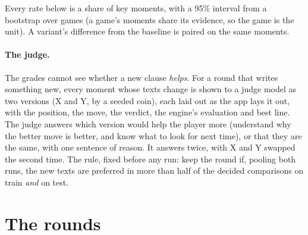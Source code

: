 \documentclass[11pt]{article}
\begin{document}
Every rate below is a share of key moments, with a 95\% interval from a bootstrap over games
(a game's moments share its evidence, so the game is the unit). A variant's difference from the
baseline is paired on the same moments.

\paragraph{The judge.} The grades cannot see whether a new clause \emph{helps}. For a round that
writes something new, every moment whose texts change is shown to a judge model as two versions
(X and Y, by a seeded coin), each laid out as the app lays it out, with the position, the move,
the verdict, the engine's evaluation and best line. The judge answers which version would help
the player more (understand why the better move is better, and know what to look for next
time), or that they are the same, with one sentence of reason. It answers twice, with X and Y
swapped the second time. The rule, fixed before any run: keep the round if, pooling both runs,
the new texts are preferred in more than half of the decided comparisons on train \emph{and} on
test.

\section{The rounds}
\end{document}
